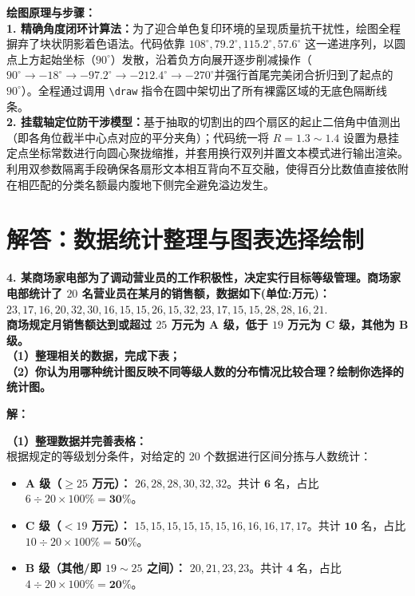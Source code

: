 \vspace{0.6cm}

{\small\color{blue!70!black}
\textbf{绘图原理与步骤：}\\
\textbf{1. 精确角度闭环计算法：}为了迎合单色复印环境的呈现质量抗干扰性，绘图全程摒弃了块状阴影着色语法。代码依靠 $108^\circ, 79.2^\circ, 115.2^\circ, 57.6^\circ$ 这一递进序列，以圆点上方起始坐标（$90^\circ$）发散，沿着负方向展开逐步削减操作（$90^\circ \to -18^\circ \to -97.2^\circ \to -212.4^\circ \to -270^\circ$并强行首尾完美闭合折归到了起点的 $90^\circ$）。全程通过调用 \texttt{\textbackslash draw} 指令在圆中架切出了所有裸露区域的无底色隔断线条。\\
\textbf{2. 挂载轴定位防干涉模型：}基于抽取的切割出的四个扇区的起止二倍角中值测出（即各角位截半中心点对应的平分夹角）；代码统一将 $R=1.3 \sim 1.4$ 设置为悬挂定点坐标常数进行向圆心聚拢缩推，并套用换行双列并置文本模式进行输出渲染。利用双参数隔离手段确保各扇形文本相互背向不互交融，使得百分比数值直接依附在相匹配的分类名额最内腹地下侧完全避免溢边发生。
}

\newpage



\section{解答：数据统计整理与图表选择绘制}

\vspace{0.6cm}

\textbf{4. 某商场家电部为了调动营业员的工作积极性，决定实行目标等级管理。商场家电部统计了 $20$ 名营业员在某月的销售额，数据如下(单位:万元)：}\\
$23,17,16,20,32,30,16,15,15,26,15,32,23,17,15,15,28,28,16,21.$\\
\textbf{商场规定月销售额达到或超过 $25$ 万元为 A 级，低于 $19$ 万元为 C 级，其他为 B 级。}\\
\textbf{（1）整理相关的数据，完成下表；}\\
\textbf{（2）你认为用哪种统计图反映不同等级人数的分布情况比较合理？绘制你选择的统计图。}

\vspace{0.4cm}

\textbf{解：}

\textbf{（1）整理数据并完善表格：} \\
根据规定的等级划分条件，对给定的 $20$ 个数据进行区间分拣与人数统计：
\begin{itemize}
  \item \textbf{A 级（$\geqslant 25$ 万元）：} $26, 28, 28, 30, 32, 32$。共计 $\boldsymbol{6}$ 名，占比 $6 \div 20 \times 100\% = \boldsymbol{30\%}$。
  \item \textbf{C 级（$< 19$ 万元）：} $15, 15, 15, 15, 15, 15, 16, 16, 16, 17, 17$。共计 $\boldsymbol{10}$ 名，占比 $10 \div 20 \times 100\% = \boldsymbol{50\%}$。
  \item \textbf{B 级（其他/即 $19 \sim 25$ 之间）：} $20, 21, 23, 23$。共计 $\boldsymbol{4}$ 名，占比 $4 \div 20 \times 100\% = \boldsymbol{20\%}$。
\end{itemize}

